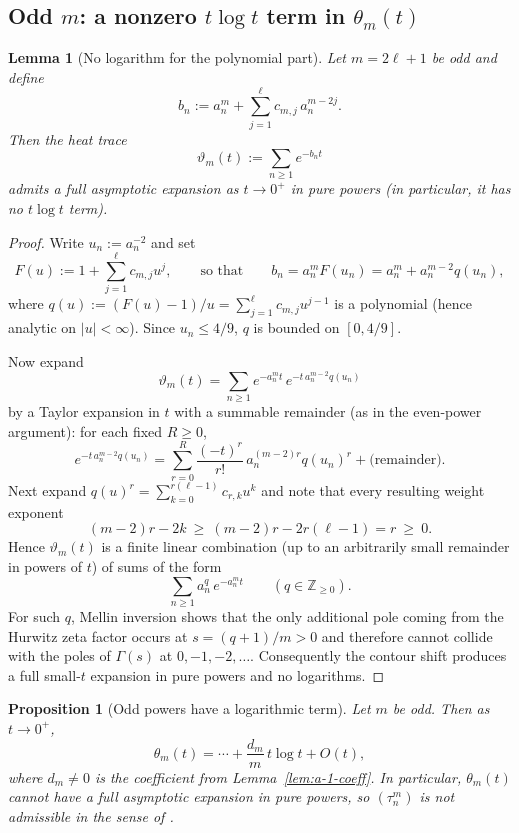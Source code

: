 \documentclass[11pt,letterpaper]{amsart}
\numberwithin{equation}{section}
\newtheorem{lemma}[theorem]{Lemma}
\newtheorem{proposition}[theorem]{Proposition}
\theoremstyle{definition}
\newcommand{\Z}{\mathbb{Z}}
\begin{document}
\subsection{Odd $m$: a nonzero $t\log t$ term in $\theta_m(t)$}

\begin{lemma}[No logarithm for the polynomial part]\label{lem:bn-no-log}
Let $m=2\ell+1$ be odd and define
\[
b_n:=a_n^m+\sum_{j=1}^{\ell} c_{m,j}\,a_n^{m-2j}.
\]
Then the heat trace
\[
\vartheta_m(t):=\sum_{n\ge1}e^{-b_n t}
\]
admits a full asymptotic expansion as $t\to0^+$ in \emph{pure powers} (in particular, it has no
$t\log t$ term).
\end{lemma}

\begin{proof}
Write $u_n:=a_n^{-2}$ and set
\[
F(u):=1+\sum_{j=1}^{\ell}c_{m,j}u^j,
\qquad\text{so that}\qquad
b_n=a_n^m F(u_n)=a_n^m+a_n^{m-2}q(u_n),
\]
where $q(u):=(F(u)-1)/u=\sum_{j=1}^{\ell}c_{m,j}u^{j-1}$ is a polynomial (hence analytic on $|u|<\infty$).
Since $u_n\le 4/9$, $q$ is bounded on $[0,4/9]$.

Now expand
\[
\vartheta_m(t)=\sum_{n\ge1}e^{-a_n^m t}\,e^{-t\,a_n^{m-2}q(u_n)}
\]
by a Taylor expansion in $t$ with a summable remainder (as in the even-power argument):
for each fixed $R\ge0$,
\[
e^{-t\,a_n^{m-2}q(u_n)}=\sum_{r=0}^{R}\frac{(-t)^r}{r!}\,a_n^{(m-2)r}q(u_n)^r+\text{(remainder)}.
\]
Next expand $q(u)^r=\sum_{k=0}^{r(\ell-1)} c_{r,k}u^k$ and note that every resulting weight exponent
\[
(m-2)r-2k \ \ge\ (m-2)r-2r(\ell-1)=r\ \ge\ 0.
\]
Hence $\vartheta_m(t)$ is a finite linear combination (up to an arbitrarily small remainder in
powers of $t$) of sums of the form
\[
\sum_{n\ge1}a_n^{q}\,e^{-a_n^m t}\qquad(q\in\Z_{\ge0}).
\]
For such $q$, Mellin inversion shows that the only additional pole coming from the Hurwitz zeta factor
occurs at $s=(q+1)/m>0$ and therefore cannot collide with the poles of $\Gamma(s)$ at $0,-1,-2,\dots$.
Consequently the contour shift produces a full small-$t$ expansion in pure powers and no logarithms.
\end{proof}



\begin{proposition}[Odd powers have a logarithmic term]\label{prop:odd-log}
Let $m$ be odd. Then as $t\to0^+$,
\[
\theta_m(t)=\cdots + \frac{d_m}{m}\,t\log t + O(t),
\]
where $d_m\neq0$ is the coefficient from Lemma~\ref{lem:a-1-coeff}. In particular, $\theta_m(t)$ cannot have
a full asymptotic expansion in pure powers, so $(\tau_n^m)$ is not admissible in the sense of \cite{QHS}.
\end{proposition}
\end{document}
